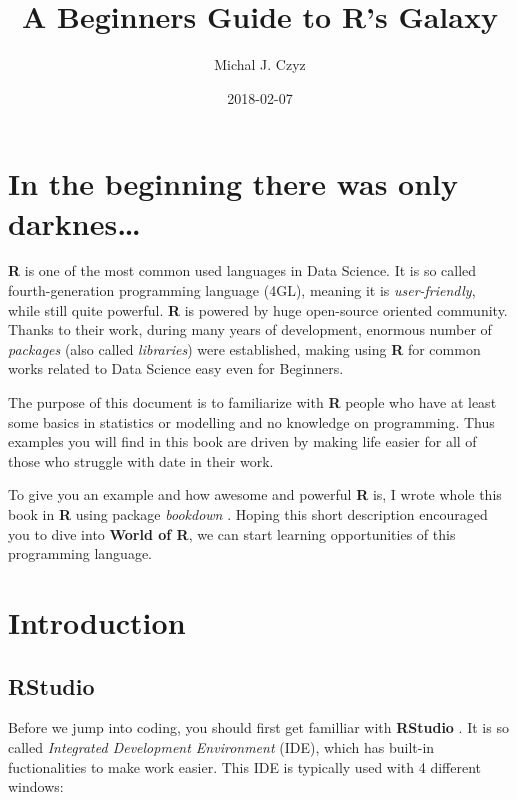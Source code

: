 \documentclass[]{book}
\title{A Beginners Guide to R's Galaxy}
\author{Michal J. Czyz}
\date{2018-02-07}
\theoremstyle{definition}
\theoremstyle{definition}
\theoremstyle{definition}
\theoremstyle{remark}
\begin{document}
\maketitle

{
\hypersetup{linkcolor=black}
\setcounter{tocdepth}{1}
\tableofcontents
}
\chapter{In the beginning there was only
darknes\ldots{}}\label{in-the-beginning-there-was-only-darknes}

\textbf{R} \citep{rcore2017} is one of the most common used languages in
Data Science. It is so called fourth-generation programming language
(4GL), meaning it is \emph{user-friendly}, while still quite powerful.
\textbf{R} is powered by huge open-source oriented community. Thanks to
their work, during many years of development, enormous number of
\emph{packages} (also called \emph{libraries}) were established, making
using \textbf{R} for common works related to Data Science easy even for
Beginners.

The purpose of this document is to familiarize with \textbf{R} people
who have at least some basics in statistics or modelling and no
knowledge on programming. Thus examples you will find in this book are
driven by making life easier for all of those who struggle with date in
their work.

To give you an example and how awesome and powerful \textbf{R} is, I
wrote whole this book in \textbf{R} using package \emph{bookdown}
\citep{xie2016, R-bookdown}. Hoping this short description encouraged
you to dive into \textbf{World of R}, we can start learning
opportunities of this programming language.

\chapter{Introduction}\label{intro}

\section{RStudio}\label{rstudio}

Before we jump into coding, you should first get familliar with
\textbf{RStudio} \citep{rstudio2017}. It is so called \emph{Integrated
Development Environment} (IDE), which has built-in fuctionalities to
make work easier. This IDE is typically used with 4 different windows:
\end{document}
